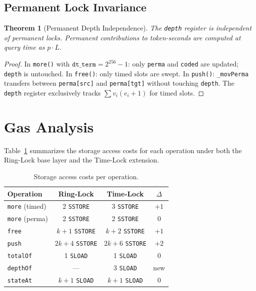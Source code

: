 \documentclass[10pt,a4paper,twocolumn]{article}
\theoremstyle{definition}
\theoremstyle{plain}
\newtheorem{theorem}{Theorem}[section]
\theoremstyle{remark}
\begin{document}
\subsection{Permanent Lock Invariance}

\begin{theorem}[Permanent Depth Independence]
\label{thm:perma-independence}
The \texttt{depth} register is independent of permanent locks. Permanent contributions to token-seconds are computed at query time as $p \cdot L$.
\end{theorem}

\begin{proof}
In \texttt{more()} with $\texttt{dt\_term} = 2^{256}{-}1$: only \texttt{perma} and \texttt{coded} are updated; \texttt{depth} is untouched. In \texttt{free()}: only timed slots are swept. In \texttt{push()}: \texttt{\_movPerma} transfers between \texttt{perma[src]} and \texttt{perma[tgt]} without touching \texttt{depth}. The \texttt{depth} register exclusively tracks $\sum v_i(e_i{+}1)$ for timed slots.
\end{proof}

\FloatBarrier

\section{Gas Analysis}
\label{sec:gas}

Table~\ref{tab:gas} summarizes the storage access costs for each operation under both the Ring-Lock base layer and the Time-Lock extension.

\begin{table}[htbp]
\centering
\caption{Storage access costs per operation.}
\label{tab:gas}
\small
\begin{tabular*}{0.95\columnwidth}{@{\extracolsep{\fill}}lccc@{}}
\toprule
Operation & Ring-Lock & Time-Lock & $\Delta$ \\
\midrule
\texttt{more} (timed) & 2 \texttt{SSTORE} & 3 \texttt{SSTORE} & $+1$ \\
\texttt{more} (perma) & 2 \texttt{SSTORE} & 2 \texttt{SSTORE} & $0$ \\
\texttt{free} & $k{+}1$ \texttt{SSTORE} & $k{+}2$ \texttt{SSTORE} & $+1$ \\
\texttt{push} & $2k{+}4$ \texttt{SSTORE} & $2k{+}6$ \texttt{SSTORE} & $+2$ \\
\texttt{totalOf} & 1 \texttt{SLOAD} & 1 \texttt{SLOAD} & $0$ \\
\texttt{depthOf} & --- & 3 \texttt{SLOAD} & new \\
\texttt{stateAt} & $k{+}1$ \texttt{SLOAD} & $k{+}1$ \texttt{SLOAD} & $0$ \\
\bottomrule
\end{tabular*}
\end{table}
\end{document}
